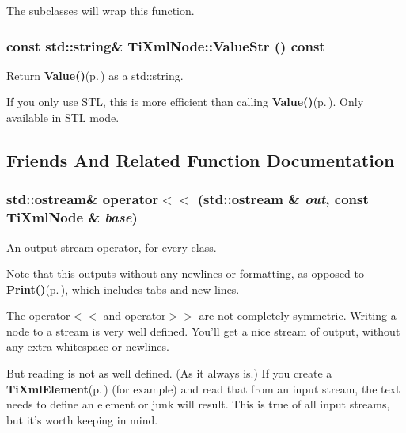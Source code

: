 The subclasses will wrap this function.
\subsubsection{\setlength{\rightskip}{0pt plus 5cm}const std::string\& Ti\-Xml\-Node::Value\-Str () const\hspace{0.3cm}{\tt  [inline, inherited]}}\label{classTiXmlNode_TiXmlUnknowna8}


Return {\bf Value()}{\rm (p.\,\pageref{classTiXmlNode_TiXmlUnknowna7})} as a std::string. 

If you only use STL, this is more efficient than calling {\bf Value()}{\rm (p.\,\pageref{classTiXmlNode_TiXmlUnknowna7})}. Only available in STL mode.

\subsection{Friends And Related Function Documentation}
\subsubsection{\setlength{\rightskip}{0pt plus 5cm}std::ostream\& operator$<$$<$ (std::ostream \& {\em out}, const {\bf Ti\-Xml\-Node} \& {\em base})\hspace{0.3cm}{\tt  [friend, inherited]}}\label{classTiXmlNode_TiXmlUnknownn1}


An output stream operator, for every class. 

Note that this outputs without any newlines or formatting, as opposed to {\bf Print()}{\rm (p.\,\pageref{classTiXmlBase_TiXmlNodea73})}, which includes tabs and new lines.

The operator$<$$<$ and operator$>$$>$ are not completely symmetric. Writing a node to a stream is very well defined. You'll get a nice stream of output, without any extra whitespace or newlines.

But reading is not as well defined. (As it always is.) If you create a {\bf Ti\-Xml\-Element}{\rm (p.\,\pageref{classTiXmlElement})} (for example) and read that from an input stream, the text needs to define an element or junk will result. This is true of all input streams, but it's worth keeping in mind.

